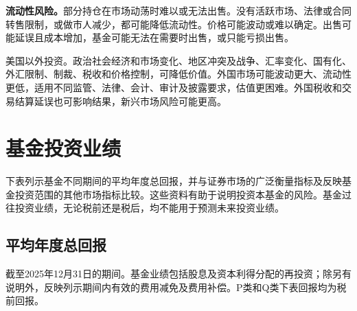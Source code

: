 \documentclass[UTF8,fontset=none,11pt,a4paper]{ctexart}
\begin{document}
\textbf{流动性风险。}部分持仓在市场动荡时难以或无法出售。没有活跃市场、法律或合同转售限制，或做市人减少，都可能降低流动性。价格可能波动或难以确定。出售可能延误且成本增加，基金可能无法在需要时出售，或只能亏损出售。


美国以外投资。政治社会经济和市场变化、地区冲突及战争、汇率变化、国有化、外汇限制、制裁、税收和价格控制，可降低价值。外国市场可能波动更大、流动性更低，适用不同监管、法律、会计、审计及披露要求，估值更困难。外国税收和交易结算延误也可影响结果，新兴市场风险可能更高。


\section*{基金投资业绩}
下表列示基金不同期间的平均年度总回报，并与证券市场的广泛衡量指标及反映基金投资范围的其他市场指标比较。这些资料有助于说明投资本基金的风险。基金过往投资业绩，无论税前还是税后，均不能用于预测未来投资业绩。


\subsection*{平均年度总回报}
截至2025年12月31日的期间。基金业绩包括股息及资本利得分配的再投资；除另有说明外，反映列示期间内有效的费用减免及费用补偿。P类和Q类下表回报均为税前回报。
\end{document}
